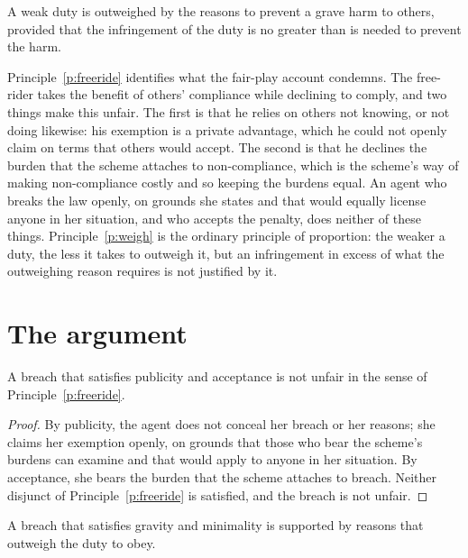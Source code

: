 \documentclass{situationist-preprint}
\begin{document}
\begin{principle}[Weighing]\label{p:weigh}
A weak duty is outweighed by the reasons to prevent a grave harm to others, provided that the infringement of the duty is no greater than is needed to prevent the harm.
\end{principle}

Principle~\ref{p:freeride} identifies what the fair-play account condemns. The free-rider takes the benefit of others' compliance while declining to comply, and two things make this unfair. The first is that he relies on others not knowing, or not doing likewise: his exemption is a private advantage, which he could not openly claim on terms that others would accept. The second is that he declines the burden that the scheme attaches to non-compliance, which is the scheme's way of making non-compliance costly and so keeping the burdens equal. An agent who breaks the law openly, on grounds she states and that would equally license anyone in her situation, and who accepts the penalty, does neither of these things. Principle~\ref{p:weigh} is the ordinary principle of proportion: the weaker a duty, the less it takes to outweigh it, but an infringement in excess of what the outweighing reason requires is not justified by it.

\section{The argument}

\begin{lemma}\label{l:fair}
A breach that satisfies publicity and acceptance is not unfair in the sense of Principle~\ref{p:freeride}.
\end{lemma}

\begin{proof}
By publicity, the agent does not conceal her breach or her reasons; she claims her exemption openly, on grounds that those who bear the scheme's burdens can examine and that would apply to anyone in her situation. By acceptance, she bears the burden that the scheme attaches to breach. Neither disjunct of Principle~\ref{p:freeride} is satisfied, and the breach is not unfair.
\end{proof}

\begin{lemma}[Outweighing]\label{l:outweigh}
A breach that satisfies gravity and minimality is supported by reasons that outweigh the duty to obey.
\end{lemma}
\end{document}
